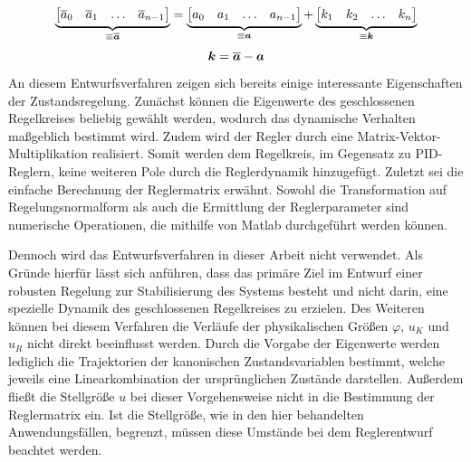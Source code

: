 \begin{equation}
\underbrace{
\begin{bmatrix}
\overline{a}_0 & \overline{a}_1 & \hdots &\overline{a}_{n-1}
\end{bmatrix}}_{\equiv \boldsymbol{\overline{a}}}
=
\underbrace{
\begin{bmatrix}
a_0 & a_1 & \hdots & a_{n-1}
\end{bmatrix}}_{\equiv \boldsymbol{a}}
+
\underbrace{
\begin{bmatrix}
k_1 & k_2 & \hdots & k_n
\end{bmatrix}}_{\equiv \boldsymbol{k}}
\end{equation}
\begin{equation}
\boldsymbol{k} = \boldsymbol{\overline{a}} - \boldsymbol{a}
\end{equation}
An diesem Entwurfsverfahren zeigen sich bereits einige interessante Eigenschaften der Zustandsregelung. Zunächst können die Eigenwerte des geschlossenen Regelkreises beliebig gewählt werden, wodurch das dynamische Verhalten maßgeblich bestimmt wird. Zudem wird der Regler durch eine Matrix-Vektor-Multiplikation realisiert. Somit werden dem Regelkreis, im Gegensatz zu PID-Reglern, keine weiteren Pole durch die Reglerdynamik hinzugefügt. Zuletzt sei die einfache Berechnung der Reglermatrix erwähnt. Sowohl die Transformation auf Regelungsnormalform als auch die Ermittlung der Reglerparameter sind numerische Operationen, die mithilfe von Matlab durchgeführt werden können.

Dennoch wird das Entwurfsverfahren in dieser Arbeit nicht verwendet. Als Gründe hierfür lässt sich anführen, dass das primäre Ziel im Entwurf einer robusten Regelung zur Stabilisierung des Systems besteht und nicht darin, eine spezielle Dynamik des geschlossenen Regelkreises zu erzielen. Des Weiteren können bei diesem Verfahren die Verläufe der physikalischen Größen $\varphi$, $u_K$ und $u_R$ nicht direkt beeinflusst werden. Durch die Vorgabe der Eigenwerte werden lediglich die Trajektorien der kanonischen Zustandsvariablen bestimmt, welche jeweils eine Linearkombination der ursprünglichen Zustände darstellen. Außerdem fließt die Stellgröße $u$ bei dieser Vorgehensweise nicht in die Bestimmung der Reglermatrix ein. Ist die Stellgröße, wie in den hier behandelten Anwendungsfällen, begrenzt, müssen diese Umstände bei dem Reglerentwurf beachtet werden.

